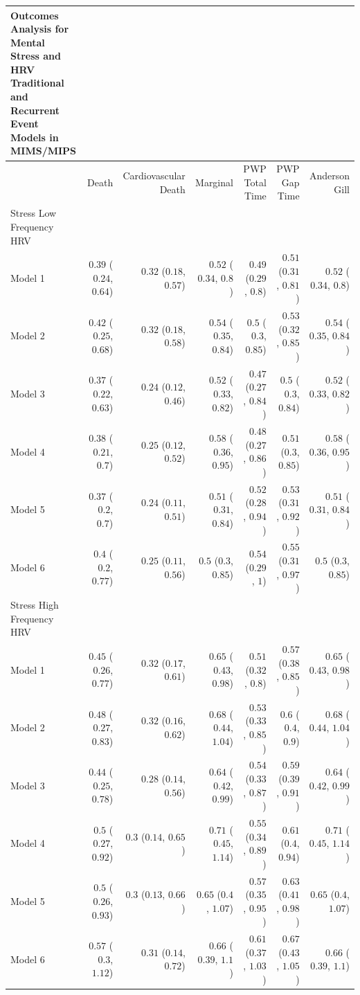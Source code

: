 \documentclass[
  11pt,
  openany]{book}
\begin{document}
\captionsetup[table]{labelformat=empty,skip=1pt}
\begin{longtable}{lrrrrrr}
\caption*{
\large Outcomes Analysis for Mental Stress and HRV\\ 
\small Traditional and Recurrent Event Models in MIMS/MIPS\\ 
} \\ 
\toprule
 & Death & Cardiovascular Death & Marginal & PWP Total Time & PWP Gap Time & Anderson Gill \\ 
\midrule
\multicolumn{1}{l}{Stress Low Frequency HRV} \\ 
\midrule
Model 1 & $0.39$ ($0.24$, $0.64$) & $0.32$ ($0.18$, $0.57$) & $0.52$ ($0.34$, $0.8$) & $0.49$ ($0.29$, $0.8$) & $0.51$ ($0.31$, $0.81$) & $0.52$ ($0.34$, $0.8$) \\ 
Model 2 & $0.42$ ($0.25$, $0.68$) & $0.32$ ($0.18$, $0.58$) & $0.54$ ($0.35$, $0.84$) & $0.5$ ($0.3$, $0.85$) & $0.53$ ($0.32$, $0.85$) & $0.54$ ($0.35$, $0.84$) \\ 
Model 3 & $0.37$ ($0.22$, $0.63$) & $0.24$ ($0.12$, $0.46$) & $0.52$ ($0.33$, $0.82$) & $0.47$ ($0.27$, $0.84$) & $0.5$ ($0.3$, $0.84$) & $0.52$ ($0.33$, $0.82$) \\ 
Model 4 & $0.38$ ($0.21$, $0.7$) & $0.25$ ($0.12$, $0.52$) & $0.58$ ($0.36$, $0.95$) & $0.48$ ($0.27$, $0.86$) & $0.51$ ($0.3$, $0.85$) & $0.58$ ($0.36$, $0.95$) \\ 
Model 5 & $0.37$ ($0.2$, $0.7$) & $0.24$ ($0.11$, $0.51$) & $0.51$ ($0.31$, $0.84$) & $0.52$ ($0.28$, $0.94$) & $0.53$ ($0.31$, $0.92$) & $0.51$ ($0.31$, $0.84$) \\ 
Model 6 & $0.4$ ($0.2$, $0.77$) & $0.25$ ($0.11$, $0.56$) & $0.5$ ($0.3$, $0.85$) & $0.54$ ($0.29$, $1$) & $0.55$ ($0.31$, $0.97$) & $0.5$ ($0.3$, $0.85$) \\ 
\midrule
\multicolumn{1}{l}{Stress High Frequency HRV} \\ 
\midrule
Model 1 & $0.45$ ($0.26$, $0.77$) & $0.32$ ($0.17$, $0.61$) & $0.65$ ($0.43$, $0.98$) & $0.51$ ($0.32$, $0.8$) & $0.57$ ($0.38$, $0.85$) & $0.65$ ($0.43$, $0.98$) \\ 
Model 2 & $0.48$ ($0.27$, $0.83$) & $0.32$ ($0.16$, $0.62$) & $0.68$ ($0.44$, $1.04$) & $0.53$ ($0.33$, $0.85$) & $0.6$ ($0.4$, $0.9$) & $0.68$ ($0.44$, $1.04$) \\ 
Model 3 & $0.44$ ($0.25$, $0.78$) & $0.28$ ($0.14$, $0.56$) & $0.64$ ($0.42$, $0.99$) & $0.54$ ($0.33$, $0.87$) & $0.59$ ($0.39$, $0.91$) & $0.64$ ($0.42$, $0.99$) \\ 
Model 4 & $0.5$ ($0.27$, $0.92$) & $0.3$ ($0.14$, $0.65$) & $0.71$ ($0.45$, $1.14$) & $0.55$ ($0.34$, $0.89$) & $0.61$ ($0.4$, $0.94$) & $0.71$ ($0.45$, $1.14$) \\ 
Model 5 & $0.5$ ($0.26$, $0.93$) & $0.3$ ($0.13$, $0.66$) & $0.65$ ($0.4$, $1.07$) & $0.57$ ($0.35$, $0.95$) & $0.63$ ($0.41$, $0.98$) & $0.65$ ($0.4$, $1.07$) \\ 
Model 6 & $0.57$ ($0.3$, $1.12$) & $0.31$ ($0.14$, $0.72$) & $0.66$ ($0.39$, $1.1$) & $0.61$ ($0.37$, $1.03$) & $0.67$ ($0.43$, $1.05$) & $0.66$ ($0.39$, $1.1$) \\ 
\bottomrule
\end{longtable}
\end{document}
